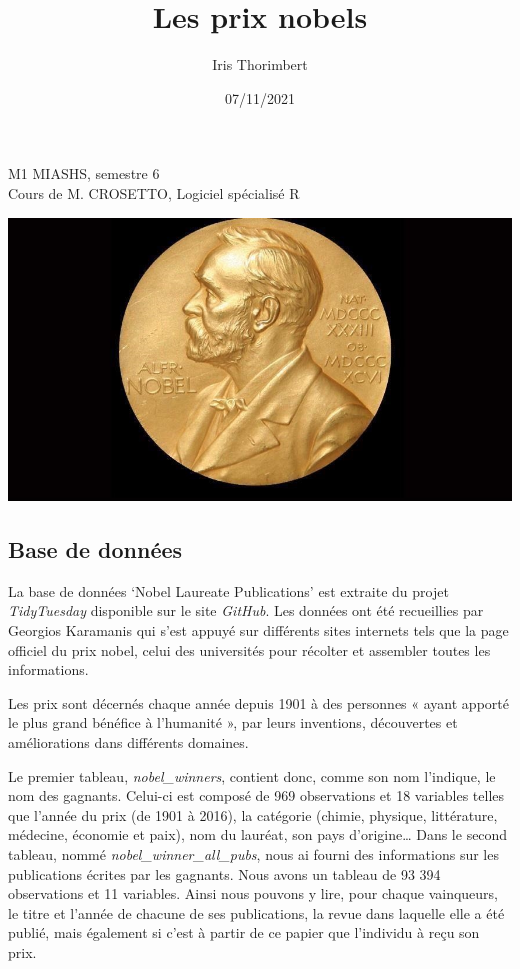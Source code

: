 \documentclass[
]{article}
\title{Les prix nobels}
\author{Iris Thorimbert}
\date{07/11/2021}
\begin{document}
\maketitle

M1 MIASHS, semestre 6\\
Cours de M. CROSETTO, Logiciel spécialisé R

\includegraphics{nobel noir.jpg}

\hypertarget{base-de-donnuxe9es}{%
\subsection{\texorpdfstring{\textbf{Base de
données}}{Base de données}}\label{base-de-donnuxe9es}}

La base de données `Nobel Laureate Publications' est extraite du projet
\emph{TidyTuesday} disponible sur le site \emph{GitHub}. Les données ont
été recueillies par Georgios Karamanis qui s'est appuyé sur différents
sites internets tels que la page officiel du prix nobel, celui des
universités pour récolter et assembler toutes les informations.

Les prix sont décernés chaque année depuis 1901 à des personnes « ayant
apporté le plus grand bénéfice à l'humanité », par leurs inventions,
découvertes et améliorations dans différents domaines.

Le premier tableau, \emph{nobel\_winners}, contient donc, comme son nom
l'indique, le nom des gagnants. Celui-ci est composé de 969 observations
et 18 variables telles que l'année du prix (de 1901 à 2016), la
catégorie (chimie, physique, littérature, médecine, économie et paix),
nom du lauréat, son pays d'origine\ldots{} Dans le second tableau, nommé
\emph{nobel\_winner\_all\_pubs}, nous ai fourni des informations sur les
publications écrites par les gagnants. Nous avons un tableau de 93 394
observations et 11 variables. Ainsi nous pouvons y lire, pour chaque
vainqueurs, le titre et l'année de chacune de ses publications, la revue
dans laquelle elle a été publié, mais également si c'est à partir de ce
papier que l'individu à reçu son prix.
\end{document}
